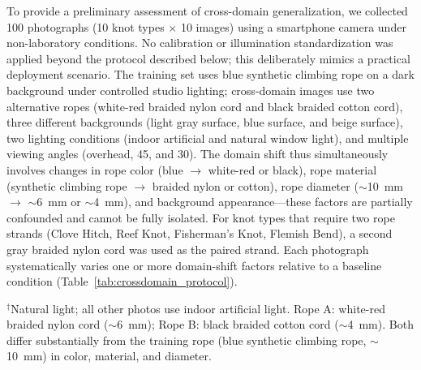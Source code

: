 \documentclass[preprint,review,12pt]{elsarticle}
\begin{document}
To provide a preliminary assessment of cross-domain generalization, we collected 100 photographs (10 knot types $\times$ 10 images) using a smartphone camera under non-laboratory conditions. No calibration or illumination standardization was applied beyond the protocol described below; this deliberately mimics a practical deployment scenario. The training set uses blue synthetic climbing rope on a dark background under controlled studio lighting; cross-domain images use two alternative ropes (white-red braided nylon cord and black braided cotton cord), three different backgrounds (light gray surface, blue surface, and beige surface), two lighting conditions (indoor artificial and natural window light), and multiple viewing angles (overhead, 45\textdegree, and 30\textdegree). The domain shift thus simultaneously involves changes in rope color (blue $\to$ white-red or black), rope material (synthetic climbing rope $\to$ braided nylon or cotton), rope diameter ($\sim$10~mm $\to$ $\sim$6~mm or $\sim$4~mm), and background appearance---these factors are partially confounded and cannot be fully isolated. For knot types that require two rope strands (Clove Hitch, Reef Knot, Fisherman's Knot, Flemish Bend), a second gray braided nylon cord was used as the paired strand. Each photograph systematically varies one or more domain-shift factors relative to a baseline condition (Table~\ref{tab:crossdomain_protocol}).

\begin{table}[htbp]
\centering
\caption{Cross-domain photography protocol. Each of the 10 photographs per knot type varies specific domain-shift factors relative to the training distribution. Photo 1 serves as the baseline (closest to training conditions except for rope color/material).}
\label{tab:crossdomain_protocol}
\small
{}
\vspace{0.3em}

\raggedright\footnotesize $^{\dagger}$Natural light; all other photos use indoor artificial light. Rope A: white-red braided nylon cord ($\sim$6~mm); Rope B: black braided cotton cord ($\sim$4~mm). Both differ substantially from the training rope (blue synthetic climbing rope, $\sim$10~mm) in color, material, and diameter.
\end{table}
\end{document}
